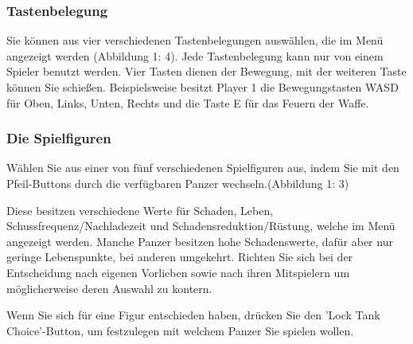 \documentclass[a4paper]{scrartcl}
\begin{document}
\subsubsection{Tastenbelegung}
Sie können aus vier verschiedenen Tastenbelegungen auswählen, die im Menü angezeigt werden (Abbildung 1: 4). Jede Tastenbelegung kann nur von einem Spieler benutzt werden. Vier Tasten dienen der Bewegung, mit der weiteren Taste können Sie schießen. 
Beispielsweise besitzt Player 1 die Bewegungstasten WASD für Oben, Links, Unten, Rechts und die Taste E für das Feuern der Waffe.

\newpage
\subsubsection{Die Spielfiguren}
Wählen Sie aus einer von fünf verschiedenen Spielfiguren aus, indem Sie mit den Pfeil-Buttons durch die verfügbaren Panzer wechseln.(Abbildung 1: 3) 

Diese besitzen verschiedene Werte für Schaden, Leben, Schussfrequenz/Nachladezeit und Schadensreduktion/Rüstung, welche im Menü angezeigt werden. Manche Panzer besitzen hohe Schadenswerte, dafür aber nur geringe Lebenspunkte, bei anderen umgekehrt. Richten Sie sich bei der Entscheidung nach eigenen Vorlieben sowie nach ihren Mitspielern um möglicherweise deren Auswahl zu kontern.


Wenn Sie sich für eine Figur entschieden haben, drücken Sie den 'Lock Tank Choice'-Button, um festzulegen mit welchem Panzer Sie spielen wollen.
\end{document}
